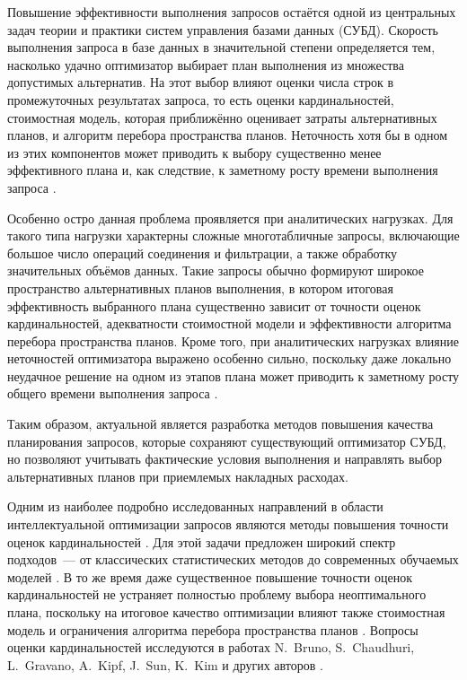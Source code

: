 {\actuality} 
Повышение эффективности выполнения запросов остаётся одной из центральных задач теории и практики систем управления базами данных (СУБД). Скорость выполнения запроса в базе данных в значительной степени определяется тем, насколько удачно оптимизатор выбирает план выполнения из множества допустимых альтернатив. На этот выбор влияют оценки числа строк в промежуточных результатах запроса, то есть оценки кардинальностей, стоимостная модель, которая приближённо оценивает затраты альтернативных планов, и алгоритм перебора пространства планов. Неточность хотя бы в одном из этих компонентов может приводить к выбору существенно менее эффективного плана и, как следствие, к заметному росту времени выполнения запроса \cite{10.14778/2850583.2850594}.

Особенно остро данная проблема проявляется при аналитических нагрузках. Для такого типа нагрузки характерны сложные многотабличные запросы, включающие большое число операций соединения и фильтрации, а также обработку значительных объёмов данных. Такие запросы обычно формируют широкое пространство альтернативных планов выполнения, в котором итоговая эффективность выбранного плана существенно зависит от точности оценок кардинальностей, адекватности стоимостной модели и эффективности алгоритма перебора пространства планов. Кроме того, при аналитических нагрузках влияние неточностей оптимизатора выражено особенно сильно, поскольку даже локально неудачное решение на одном из этапов плана может приводить к заметному росту общего времени выполнения запроса \cite{10.14778/2850583.2850594, 10.1145/3318464.3380584}.

Таким образом, актуальной является разработка методов повышения качества планирования запросов, которые сохраняют существующий оптимизатор СУБД, но позволяют учитывать фактические условия выполнения и направлять выбор альтернативных планов при приемлемых накладных расходах.

{\progress}
Одним из наиболее подробно исследованных направлений в области интеллектуальной оптимизации запросов являются методы повышения точности оценок кардинальностей \cite{10.14778/3485450.3485459, 10.1145/3514221.3526154}. Для этой задачи предложен широкий спектр подходов~--- от классических статистических методов \cite{10.1145/376284.375686} до современных обучаемых моделей \cite{kipf2018learnedcardinalitiesestimatingcorrelated}. В то же время даже существенное повышение точности оценок кардинальностей не устраняет полностью проблему выбора неоптимального плана, поскольку на итоговое качество оптимизации влияют также стоимостная модель и ограничения алгоритма перебора пространства планов \cite{10.14778/2850583.2850594, 10.14778/1687627.1687739}. Вопросы оценки кардинальностей исследуются в работах N.~Bruno, S.~Chaudhuri, L.~Gravano, A.~Kipf, J.~Sun, K.~Kim и других авторов \cite{10.1145/376284.375686,kipf2018learnedcardinalitiesestimatingcorrelated,10.14778/3485450.3485459,10.1145/3514221.3526154}.

